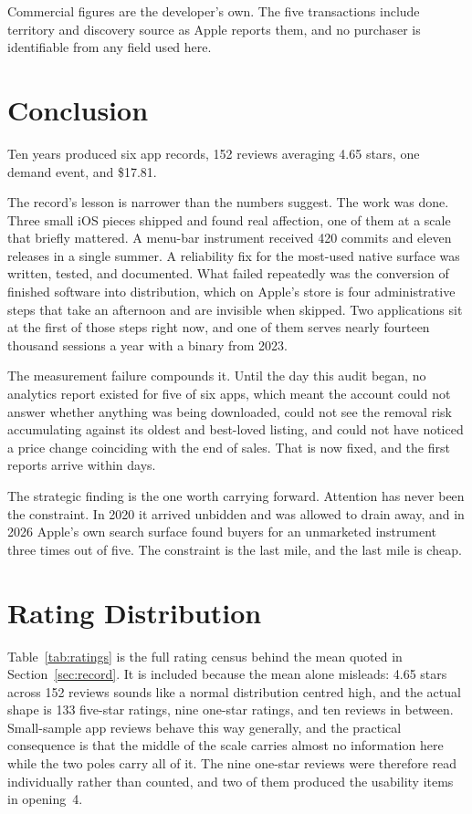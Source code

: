 \documentclass[10pt,letterpaper,twocolumn]{article}
\begin{document}
Commercial figures are the developer's own. The five transactions include
territory and discovery source as Apple reports them, and no purchaser is
identifiable from any field used here.

\section{Conclusion}
\label{sec:conclusion}

Ten years produced six app records, 152 reviews averaging 4.65 stars, one
demand event, and \$17.81.

The record's lesson is narrower than the numbers suggest. The work was
done. Three small iOS pieces shipped and found real affection, one of
them at a scale that briefly mattered. A menu-bar instrument received 420
commits and eleven releases in a single summer. A reliability fix for the
most-used native surface was written, tested, and documented. What
failed repeatedly was the conversion of finished software into
distribution, which on Apple's store is four administrative steps that
take an afternoon and are invisible when skipped. Two applications sit at
the first of those steps right now, and one of them serves nearly
fourteen thousand sessions a year with a binary from 2023.

The measurement failure compounds it. Until the day this audit began, no
analytics report existed for five of six apps, which meant the account
could not answer whether anything was being downloaded, could not see the
removal risk accumulating against its oldest and best-loved listing, and
could not have noticed a price change coinciding with the end of sales.
That is now fixed, and the first reports arrive within days.

The strategic finding is the one worth carrying forward. Attention has
never been the constraint. In 2020 it arrived unbidden and was allowed to
drain away, and in 2026 Apple's own search surface found buyers for an
unmarketed instrument three times out of five. The constraint is the last
mile, and the last mile is cheap.

\appendix

\section{Rating Distribution}
\label{sec:appendix}

Table~\ref{tab:ratings} is the full rating census behind the mean quoted
in Section~\ref{sec:record}. It is included because the mean alone
misleads: 4.65 stars across 152 reviews sounds like a normal
distribution centred high, and the actual shape is 133 five-star ratings,
nine one-star ratings, and ten reviews in between. Small-sample app
reviews behave this way generally, and the practical consequence is that
the middle of the scale carries almost no information here while the two
poles carry all of it. The nine one-star reviews were therefore read
individually rather than counted, and two of them produced the usability
items in opening~4.
\end{document}
